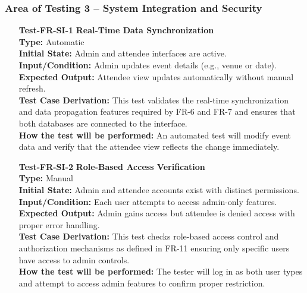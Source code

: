 \documentclass[12pt, titlepage]{article}
\begin{document}
\subsubsection{Area of Testing 3 – System Integration and Security}

\begin{enumerate}

\item[\textbf{Test-FR-SI-1}] \textbf{Real-Time Data Synchronization}\\
\textbf{Type:} Automatic\\
\textbf{Initial State:} Admin and attendee interfaces are active.\\
\textbf{Input/Condition:} Admin updates event details (e.g., venue or date).\\
\textbf{Expected Output:} Attendee view updates automatically without manual refresh.\\
\textbf{Test Case Derivation:} This test validates the real-time synchronization and data propagation features required by FR-6 and FR-7 and ensures that both databases are connected to the interface.\\
\textbf{How the test will be performed:} An automated test will modify event data and verify that the attendee view reflects the change immediately.\\[6pt]

\item[\textbf{Test-FR-SI-2}] \textbf{Role-Based Access Verification}\\
\textbf{Type:} Manual\\
\textbf{Initial State:} Admin and attendee accounts exist with distinct permissions.\\
\textbf{Input/Condition:} Each user attempts to access admin-only features.\\
\textbf{Expected Output:} Admin gains access but attendee is denied access with proper error handling.\\
\textbf{Test Case Derivation:} This test checks role-based access control and authorization mechanisms as defined in FR-11 ensuring only specific users have access to admin controls.\\
\textbf{How the test will be performed:} The tester will log in as both user types and attempt to access admin features to confirm proper restriction.\\[12pt]

\end{enumerate}

\end{document}
